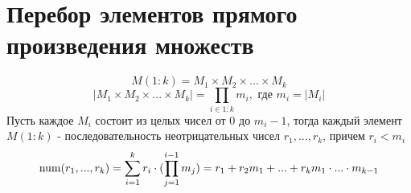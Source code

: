 \documentclass[discrete.tex]{subfiles}
\begin{document}
\section{Перебор элементов прямого произведения множеств}
\[M(1:k) = M_1 \times M_2 \times ... \times M_k\]
\[|M_1 \times M_2 \times ... \times M_k| = \prod_{i \in 1:k} m_i, \text{ где }m_i = |M_i|\]
Пусть каждое $M_i$ состоит из целых чисел от 0 до $m_i - 1$, тогда каждый элемент $M(1:k)$ - последовательность неотрицательных чисел $r_1,...,r_k$, причем $r_i < m_i$
\[\mathop{\rm num}\nolimits(r_1,...,r_k) = \sum^k_{i=1} r_i \cdot (\prod_{j=1}^{i-1} m_j) = r_1 + r_2 m_1 + ... + r_k m_1 \cdot ... \cdot m_{k-1}\]
\end{document}
